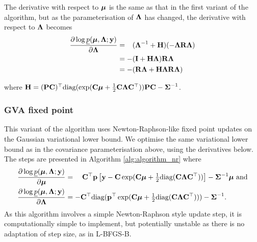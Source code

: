 \documentclass{amsart}[12pt]
\begin{document}
	\noindent The derivative with respect to ${\boldsymbol \mu}$ is the same as that in the first variant of the algorithm, but 
	as the parameterisation of ${\boldsymbol \Lambda}$ has changed, the  derivative with respect to ${\boldsymbol \Lambda}$ becomes
	\begin{align*}
		\frac{\partial \log \underline{p}({\boldsymbol \mu}, {\boldsymbol \Lambda}; {\bf y})}{\partial {\boldsymbol\Lambda}}
		  & = \hphantom{-}({\boldsymbol \Lambda}^{-1} + {\bf H})(-{\boldsymbol \Lambda} {\bf R} {\boldsymbol \Lambda}) \\
		  & = -({\bf I} + {\bf H}{\boldsymbol \Lambda}){\bf R}{\boldsymbol \Lambda}                           \\
		  & = - ({\bf R}{\boldsymbol \Lambda} + {\bf H}{\boldsymbol \Lambda}{\bf R}{\boldsymbol \Lambda})                  
	\end{align*} 
		
	\noindent where ${\bf H} = ({\bf P} {\bf C})^\top \text{diag}(\exp({\bf C} {\boldsymbol \mu} + \tfrac{1}{2} {\bf C} {\boldsymbol \Lambda} {\bf C}^\top)) {\bf P} {\bf C} - {\boldsymbol \Sigma}^{-1}$.
		
	\subsubsection{GVA fixed point}
		
		
	This variant of the algorithm uses Newton-Raphson-like fixed point updates on the Gaussian variational lower
	bound. We optimise the same variational lower bound as in the covariance parameterisation above, using the
	derivatives below. The steps are presented in Algorithm \ref{alg:algorithm_nr} where	
	\begin{align*}
		\frac{\partial \log \underline{p}({\boldsymbol \mu}, {\boldsymbol \Lambda}; {\bf y})}{\partial {\boldsymbol\mu}}     & = \quad {\bf C}^\top{\bf p} \left [{\bf y} - {\bf C}\exp({\bf C} {\boldsymbol \mu} + \tfrac{1}{2} \text{diag}({\bf C} {\boldsymbol \Lambda} {\bf C}^\top)) \right ] - {\boldsymbol \Sigma}^{-1} {\boldsymbol \mu} \text{ and} \\
		\frac{\partial \log \underline{p}({\boldsymbol \mu}, {\boldsymbol \Lambda}; {\bf y})}{\partial {\boldsymbol\Lambda}} & = -{\bf C}^\top \text{diag}({\bf p}^\top \exp({\bf C} {\boldsymbol \mu} +\tfrac{1}{2} \text{diag}({\bf C} {\boldsymbol \Lambda} {\bf C}^\top))) - {\boldsymbol \Sigma}^{-1}.                             
	\end{align*}
	As this algorithm involves a simple Newton-Raphson style update step, it is computationally simple to
	implement, but potentially unstable as there is no adaptation of step size, as in L-BFGS-B.
\end{document}
